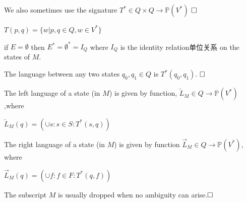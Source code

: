 \begin{remark}
	We also sometimes use the signature $T^\ast\in Q\times Q\to \mathbb{P}(V^\ast)$ $\hfill\square$
\end{remark}

\begin{note}
	$T(p,q)=\{w|p,q\in Q,w\in V^\ast\}$
\end{note}

\begin{remark}
	if $E=\emptyset$ then $E^\ast=\emptyset^\ast=I_Q$ where $I_Q$ is the identity relation单位关系 on the states of $M$.
\end{remark}

\begin{definition} 
	The language between any two states $q_0,q_1\in Q$ is $T^\ast(q_0,q_1)$. $\hfill\square$
\end{definition}

\begin{definition}
	The left language of a state (in $M$) is given by function, $\overleftarrow{L}_M\in Q\to\mathbb{P}(V^\ast)$,where
	
	$\overleftarrow{L}_M(q)=(\cup s:s\in S:T^\ast(s,q))$
	
	The right language of a state (in $M$) is given by function $\overrightarrow{L}_M\in Q\to\mathbb{P}(V^\ast)$, where
	
	$\overrightarrow{L}_M(q)=(\cup f:f\in F:T^\ast(q,f))$
	
	The subscript $M$ is usually dropped when no ambiguity can arise.$\hfill\square$
\end{definition}

